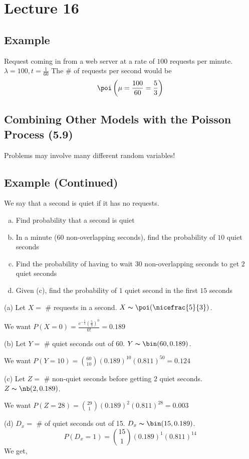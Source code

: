 \section{Lecture 16}
\subsection{Example}
Request coming in from a web server at a rate of $ 100 $ requests per minute.
$ \lambda = 100, t=\frac{1}{60} $
The \# of requests per second would be
\[ \poi\left(\mu=\frac{100}{60}=\frac{5}{3}\right) \]

\subsection{Combining Other Models with the Poisson Process (5.9)}
Problems may involve many different random variables!

\subsection{Example (Continued)}
We say that a second is quiet if it has no requests.
\begin{enumerate}[(a)]
    \item Find probability that a second is quiet
    \item In a minute ($60$ non-overlapping seconds), find the probability of $10$ quiet seconds
    \item Find the probability of having to wait $ 30 $ non-overlapping seconds to get $ 2 $ quiet seconds
    \item Given (c), find the probability of $ 1 $ quiet second in the first $ 15 $ seconds
\end{enumerate}
(a) Let $ X= $ \# requests in a second. $ X \thicksim \poi(\nicefrac{5}{3}) $.

We want $ P(X=0)=\frac{e^{-\frac{5}{3}}\left(\frac{5}{3}\right)^0}{0!}=0.189 $


(b) Let $ Y= $ \# quiet seconds out of 60. $ Y \thicksim \bin(60,0.189) $.

We want $ P(Y=10)=\binom{60}{10}(0.189)^{10}(0.811)^{50}=0.124 $

(c) Let $ Z= $ \# non-quiet seconds before getting $ 2 $ quiet seconds. 
$ Z \thicksim \nb(2,0.189) $.

We want $ P(Z=28)=\binom{29}{1}(0.189)^2(0.811)^{28}=0.003 $

(d) $ D_x=$ \# of quiet seconds out of 15. $ D_x \thicksim \bin(15,0.189) $.
\[ P(D_x=1)=\binom{15}{1}(0.189)^1(0.811)^{14} \]
We get,

